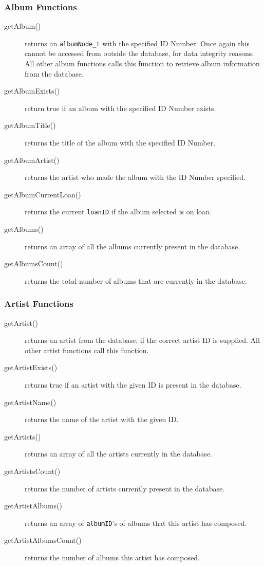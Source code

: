 \documentclass{article}
\begin{document}
\subsubsection{Album Functions}
\begin{description}
\item[getAlbum()] returns an \verb|albumNode_t| with the specified ID Number. Once again this cannot be accessed from outside the database, for data integrity reasons. All other album functions calls this function to retrieve album information from the database.
\item[getAlbumExists()] return true if an album with the specified ID Number exists.
\item[getAlbumTitle()] returns the title of the album with the specified ID Number.
\item[getAlbumArtist()] returns the artist who made the album with the ID Number specified.
\item[getAlbumCurrentLoan()] returns the current \verb|loanID| if the album selected is on loan.
\item[getAlbums()] returns an array of all the albums currently present in the database.
\item[getAlbumsCount()] returns the total number of albums that are currently in the database.
\end{description}

\subsubsection{Artist Functions}
\begin{description}
\item[getArtist()] returns an artist from the database, if the correct artist ID is supplied. All other artist functions call this function.
\item[getArtistExists()] returns true if an artist with the given ID is present in the database.
\item[getArtistName()] returns the name of the artist with the given ID.
\item[getArtists()] returns an array of all the artists currently in the database.
\item[getArtistsCount()] returns the number of artists currently present in the database.
\item[getArtistAlbums()] returns an array of \verb|albumID|'s of albums that this artist has composed.
\item[getArtistAlbumsCount()] returns the number of albums this artist has composed.
\end{description}
\end{document}
